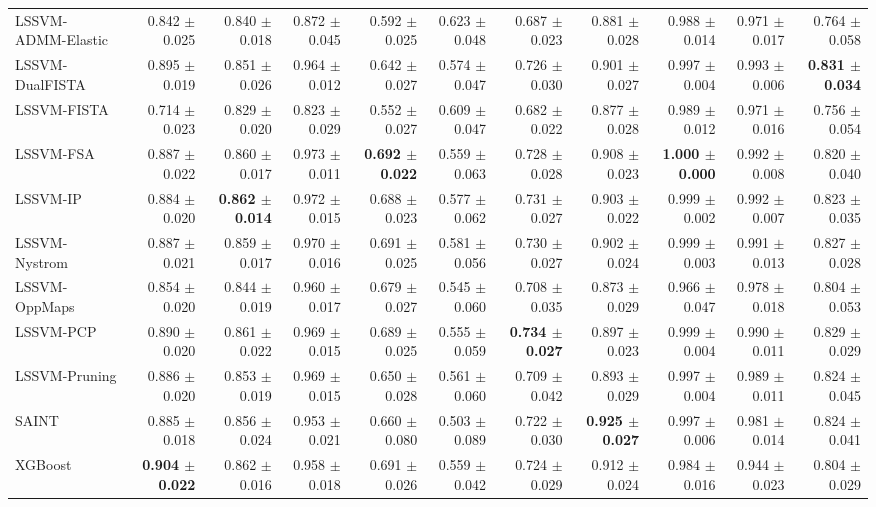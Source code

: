 \begin{table}[ht]
{\begin{tabular}{lrrrrrrrrrr}
LSSVM-ADMM-Elastic & 0.842 $\pm$ 0.025 & 0.840 $\pm$ 0.018 & 0.872 $\pm$ 0.045 & 0.592 $\pm$ 0.025 & 0.623 $\pm$ 0.048 & 0.687 $\pm$ 0.023 & 0.881 $\pm$ 0.028 & 0.988 $\pm$ 0.014 & 0.971 $\pm$ 0.017 & 0.764 $\pm$ 0.058 \\
LSSVM-DualFISTA & 0.895 $\pm$ 0.019 & 0.851 $\pm$ 0.026 & 0.964 $\pm$ 0.012 & 0.642 $\pm$ 0.027 & 0.574 $\pm$ 0.047 & 0.726 $\pm$ 0.030 & 0.901 $\pm$ 0.027 & 0.997 $\pm$ 0.004 & 0.993 $\pm$ 0.006 & \textbf{0.831 $\pm$ 0.034} \\
LSSVM-FISTA & 0.714 $\pm$ 0.023 & 0.829 $\pm$ 0.020 & 0.823 $\pm$ 0.029 & 0.552 $\pm$ 0.027 & 0.609 $\pm$ 0.047 & 0.682 $\pm$ 0.022 & 0.877 $\pm$ 0.028 & 0.989 $\pm$ 0.012 & 0.971 $\pm$ 0.016 & 0.756 $\pm$ 0.054 \\
LSSVM-FSA & 0.887 $\pm$ 0.022 & 0.860 $\pm$ 0.017 & 0.973 $\pm$ 0.011 & \textbf{0.692 $\pm$ 0.022} & 0.559 $\pm$ 0.063 & 0.728 $\pm$ 0.028 & 0.908 $\pm$ 0.023 & \textbf{1.000 $\pm$ 0.000} & 0.992 $\pm$ 0.008 & 0.820 $\pm$ 0.040 \\
LSSVM-IP & 0.884 $\pm$ 0.020 & \textbf{0.862 $\pm$ 0.014} & 0.972 $\pm$ 0.015 & 0.688 $\pm$ 0.023 & 0.577 $\pm$ 0.062 & 0.731 $\pm$ 0.027 & 0.903 $\pm$ 0.022 & 0.999 $\pm$ 0.002 & 0.992 $\pm$ 0.007 & 0.823 $\pm$ 0.035 \\
LSSVM-Nystrom & 0.887 $\pm$ 0.021 & 0.859 $\pm$ 0.017 & 0.970 $\pm$ 0.016 & 0.691 $\pm$ 0.025 & 0.581 $\pm$ 0.056 & 0.730 $\pm$ 0.027 & 0.902 $\pm$ 0.024 & 0.999 $\pm$ 0.003 & 0.991 $\pm$ 0.013 & 0.827 $\pm$ 0.028 \\
LSSVM-OppMaps & 0.854 $\pm$ 0.020 & 0.844 $\pm$ 0.019 & 0.960 $\pm$ 0.017 & 0.679 $\pm$ 0.027 & 0.545 $\pm$ 0.060 & 0.708 $\pm$ 0.035 & 0.873 $\pm$ 0.029 & 0.966 $\pm$ 0.047 & 0.978 $\pm$ 0.018 & 0.804 $\pm$ 0.053 \\
LSSVM-PCP & 0.890 $\pm$ 0.020 & 0.861 $\pm$ 0.022 & 0.969 $\pm$ 0.015 & 0.689 $\pm$ 0.025 & 0.555 $\pm$ 0.059 & \textbf{0.734 $\pm$ 0.027} & 0.897 $\pm$ 0.023 & 0.999 $\pm$ 0.004 & 0.990 $\pm$ 0.011 & 0.829 $\pm$ 0.029 \\
LSSVM-Pruning & 0.886 $\pm$ 0.020 & 0.853 $\pm$ 0.019 & 0.969 $\pm$ 0.015 & 0.650 $\pm$ 0.028 & 0.561 $\pm$ 0.060 & 0.709 $\pm$ 0.042 & 0.893 $\pm$ 0.029 & 0.997 $\pm$ 0.004 & 0.989 $\pm$ 0.011 & 0.824 $\pm$ 0.045 \\
SAINT & 0.885 $\pm$ 0.018 & 0.856 $\pm$ 0.024 & 0.953 $\pm$ 0.021 & 0.660 $\pm$ 0.080 & 0.503 $\pm$ 0.089 & 0.722 $\pm$ 0.030 & \textbf{0.925 $\pm$ 0.027} & 0.997 $\pm$ 0.006 & 0.981 $\pm$ 0.014 & 0.824 $\pm$ 0.041 \\
XGBoost & \textbf{0.904 $\pm$ 0.022} & 0.862 $\pm$ 0.016 & 0.958 $\pm$ 0.018 & 0.691 $\pm$ 0.026 & 0.559 $\pm$ 0.042 & 0.724 $\pm$ 0.029 & 0.912 $\pm$ 0.024 & 0.984 $\pm$ 0.016 & 0.944 $\pm$ 0.023 & 0.804 $\pm$ 0.029 \\
    \bottomrule
  \end{tabular}}
\end{table}